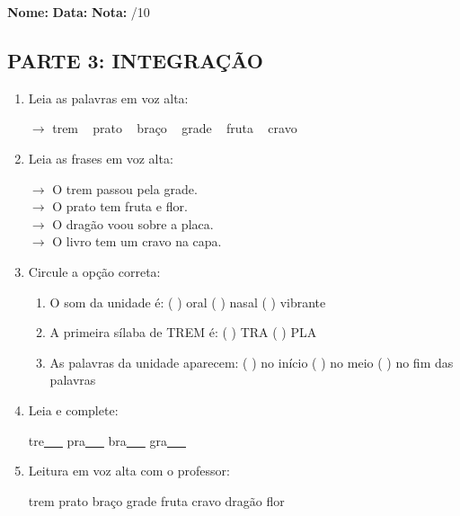 \begin{exercicio}

\noindent\textbf{Nome:} \underline{\hspace{3.2cm}} \quad \textbf{Data:} \underline{\hspace{1.6cm}} \quad \textbf{Nota:} \underline{\hspace{0.9cm}}/10


\subsection*{PARTE 3: INTEGRAÇÃO}

\begin{enumerate}[resume]

  \item Leia as palavras em voz alta:
  \begin{center}
  $\rightarrow$ trem ~ prato ~ braço ~ grade ~ fruta ~ cravo
  \end{center}

  \item Leia as frases em voz alta:
  \begin{center}
  $\rightarrow$ O trem passou pela grade.\\
  $\rightarrow$ O prato tem fruta e flor.\\
  $\rightarrow$ O dragão voou sobre a placa.\\
  $\rightarrow$ O livro tem um cravo na capa.\\
  \end{center}

  \item Circule a opção correta:
  \begin{enumerate}[label=(\alph*)]

    \item O som da unidade é: ( ) oral ( ) nasal ( ) vibrante

    \item A primeira sílaba de TREM é: ( ) TRA ( ) PLA

    \item As palavras da unidade aparecem: ( ) no início ( ) no meio ( ) no fim das palavras

  \end{enumerate}

  \item Leia e complete:
  \begin{center}
  tre\underline{~~~} \quad pra\underline{~~~} \quad bra\underline{~~~} \quad gra\underline{~~~}
  \end{center}

  \item Leitura em voz alta com o professor:
  \begin{center}
  trem \quad prato \quad braço \quad grade \quad fruta \quad cravo \quad dragão \quad flor
  \end{center}

\end{enumerate}

\end{exercicio}


